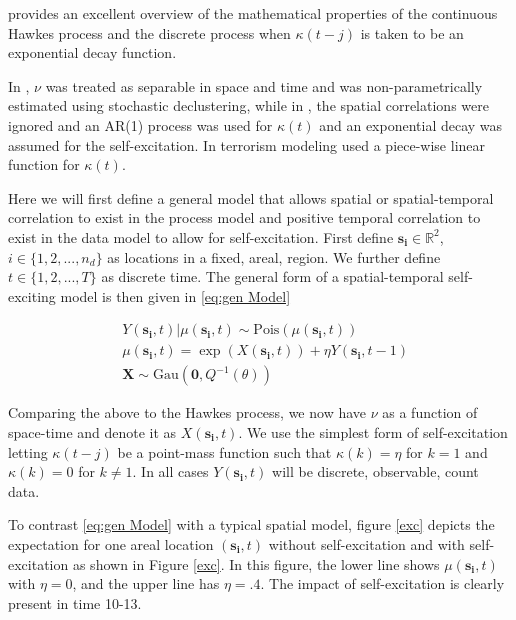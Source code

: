 \documentclass[11pt]{isuthesis}
\begin{document}
\cite{laub2015hawkes} provides an excellent overview of the mathematical properties of the continuous Hawkes process and the discrete process when $\kappa (t-j)$ is taken to be an exponential decay function.

In \cite{mohler2011self}, $\nu$ was treated as separable in space and time and was non-parametrically estimated using stochastic declustering, while in \cite{mohler2013modeling}, the spatial correlations were ignored and an AR(1) process was used for $\kappa(t)$ and an exponential decay was assumed for the self-excitation.  In terrorism modeling \cite{lewis2012self} used a piece-wise linear function for $\kappa(t)$.  

Here we will first define a general model that allows spatial or spatial-temporal correlation to exist in the process model and positive temporal correlation to exist in the data model to allow for self-excitation.  First define $\boldsymbol{s_i} \in \mathbb{R}^2$, $i \in \{1,2,...,n_d\}$ as locations in a fixed, areal, region. We further define $t \in \{1,2,...,T\}$ as discrete time. The general form of a spatial-temporal self-exciting model is then given in \eqref{eq:gen Model}

\begin{align}
& Y(\boldsymbol{s_i},t)|\mu(\boldsymbol{s_i},t) \sim \mbox{Pois}(\mu(\boldsymbol{s_i},t)) \label{eq:gen Model}\\
& \mu(\boldsymbol{s_i},t) = \exp(X(\boldsymbol{s_i},t)) + \eta Y(\boldsymbol{s_i},t-1) \nonumber \\
& \boldsymbol{X} \sim \mbox{Gau}(\boldsymbol{0},Q^{-1}(\theta)) \nonumber
\end{align}

Comparing the above to the Hawkes process, we now have $\nu$ as a function of space-time and denote it as $X(\boldsymbol{s_i},t)$.  We use the simplest form of self-excitation letting $\kappa(t-j)$ be a point-mass function such that $\kappa(k)=\eta$ for $k=1$ and $\kappa(k)=0$ for $k \neq 1$.  In all cases $Y(\boldsymbol{s_i},t)$ will be discrete, observable, count data.  

To contrast \eqref{eq:gen Model} with a typical spatial model, figure \ref{exc} depicts the expectation for one areal location $(\boldsymbol{s_i},t)$ without self-excitation and with self-excitation as shown in Figure \ref{exc}. In this figure, the lower line shows $\mu(\boldsymbol{s_i},t)$ with $\eta=0$, and the upper line has $\eta=.4$.  The impact of self-excitation is clearly present in time 10-13.
\end{document}
